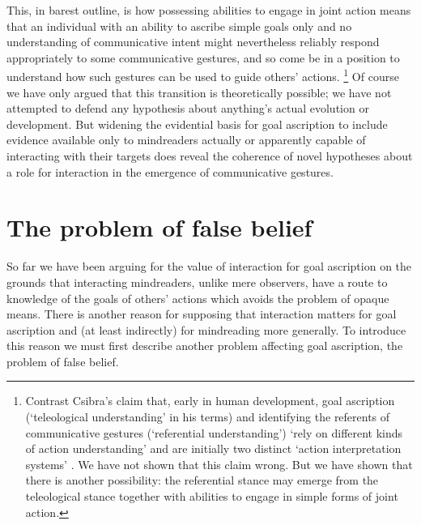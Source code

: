 \documentclass[12pt,a4paper]{extarticle}
\begin{document}
This, in barest outline, is 
how
possessing abilities to engage in joint action
means that 
an individual with an ability to ascribe simple goals only and no understanding of communicative intent
might 
nevertheless reliably respond appropriately to some communicative gestures,
and so come be in a position to understand how such gestures can be used to guide others' actions.%
\footnote{
Contrast Csibra's claim that,
early in human development,
goal ascription (`teleological understanding' in his terms)
and 
identifying the referents of communicative gestures (`referential understanding')
`rely on different kinds of action understanding' %
and
are initially two distinct `action interpretation systems'   \citep[p.\ 456]{Csibra:2003kp}.
We have not shown that this claim wrong.
But we have shown that there is another possibility:
the referential stance may 
emerge from
the teleological stance
 together with abilities to engage in simple forms of joint action.
}
Of course we have only argued that this transition is theoretically possible;
we have not attempted to defend any hypothesis about 
anything's actual evolution or development.
But widening the evidential basis for goal ascription
to include evidence available only to mindreaders actually or apparently capable of interacting with their targets
does reveal the coherence of  
novel hypotheses about a role for interaction in the emergence  of communicative gestures.



\section{The problem of false belief}
\label{sec:false_belief}
So far we have been arguing for the value of interaction for goal ascription
on the grounds that 
interacting mindreaders, unlike mere observers, have 
a route to knowledge of the goals of others' actions
which avoids the problem of opaque means.
There is another reason for supposing that interaction matters for goal ascription and (at least indirectly) for mindreading more generally.
To introduce this reason we must first describe another problem affecting goal ascription, the problem of false belief.
\end{document}
